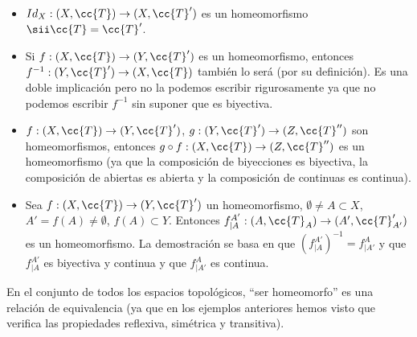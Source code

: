\begin{ejemplo}\
    \begin{itemize}
        \item $Id_X : (X, \cc{T})\to (X, \cc{T}')$ es un homeomorfismo $\sii \cc{T}=\cc{T}'$.
        \item Si $f:(X, \cc{T})\to (Y, \cc{T}')$ es un homeomorfismo, entonces $f^{-1}:(Y, \cc{T}')\to (X, \cc{T})$ también lo será (por su definición). Es una doble implicación pero no la podemos escribir rigurosamente ya que no podemos escribir $f^{-1}$ sin suponer que es biyectiva.
        \item $f:(X, \cc{T})\to (Y, \cc{T}')$, $g:(Y, \cc{T}')\to (Z, \cc{T}'')$ son homeomorfismos, entonces $g\circ f:(X, \cc{T})\to (Z, \cc{T}'')$ es un homeomorfismo (ya que la composición de biyecciones es biyectiva, la composición de abiertas es abierta y la composición de continuas es continua).
        \item Sea $f:(X, \cc{T}) \to (Y, \cc{T}')$ un homeomorfismo, $\emptyset\neq A \subset X$, $A'=f(A)\neq \emptyset$, $f(A)\subset Y$. Entonces $f_{|A}^{A'}:(A, \cc{T}_A)\to (A', \cc{T}_{A'}')$ es un homeomorfismo. La demostración se basa en que $(f_{|A}^{A'})^{-1} = f_{|A'}^A$ y que $f_{|A}^{A'}$ es biyectiva y continua y que $f_{|A'}^A$ es continua.
    \end{itemize}
    \endsquare
\end{ejemplo}

\begin{observacion}
    En el conjunto de todos los espacios topológicos, ``ser homeomorfo'' es una relación de equivalencia (ya que en los ejemplos anteriores hemos visto que verifica las propiedades reflexiva, simétrica y transitiva).
    \endsquare
\end{observacion}

